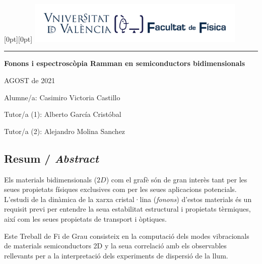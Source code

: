 \documentclass[12pt]{article} %
\author{Casimiro Victoria Castillo}
\begin{document}
\begin{titlepage}
   \noindent\raisebox{0pt}[0pt][0pt]{
	\includegraphics[width=10.5cm]{./portada-TFG-LaTeX/marca-Facultat-Fisica-UV-1-linia.pdf}}\par
   \vspace{8.5cm}
   {\centering
      \par
      \rule{16.13cm}{1.5pt}\par
      \vspace{4.5cm}
      {\bfseries\sffamily\LARGE Fonons i espectroscòpia Ramman en semiconductors bidimensionals}\par
   }
   \vfill
   {\raggedleft\sffamily
		AGOST de 2021\par
      \vspace{\baselineskip}
		Alumne/a: Casimiro Victoria Castillo\par
      \vspace{\baselineskip}
		Tutor/a (1): Alberto García Cristóbal\par
		Tutor/a (2): Alejandro Molina Sanchez\par
   }
\end{titlepage}
\restoregeometry


\subsection*{Resum / \emph{Abstract}}

Els materials bidimensionals ($2D$) com el grafè són de gran interès tant per les seues propietats físiques exclusives com per les seues aplicacions potencials. L'estudi de la dinàmica de la xarxa cristal·lina (\textit{fonons}) d'estos materials és un requisit previ per entendre la seua estabilitat estructural i propietats tèrmiques, així com les seues propietats de transport i òptiques.   


Este Treball de Fi de Grau consisteix en la computació dels modes vibracionals de materials semiconductors 2D y la seua correlació amb els observables rellevants per a la interpretació dels experiments de dispersió de la llum.
\vspace{\baselineskip}
\end{document}
